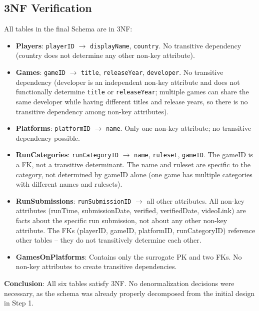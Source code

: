 \documentclass[11pt]{article}
\begin{document}
\subsection*{3NF Verification}

All tables in the final Schema are in 3NF:
\begin{itemize}[leftmargin=2em]
    \item \textbf{Players}: \texttt{playerID} $\rightarrow$ \texttt{displayName}, \texttt{country}. No transitive dependency (country does not determine any other non-key attribute).
    \item \textbf{Games}: \texttt{gameID} $\rightarrow$ \texttt{title}, \texttt{releaseYear}, \texttt{developer}. No transitive dependency (developer is an independent non-key attribute and does not functionally determine \texttt{title} or \texttt{releaseYear}; multiple games can share the same developer while having different titles and release years, so there is no transitive dependency among non-key attributes).
    \item \textbf{Platforms}: \texttt{platformID} $\rightarrow$ \texttt{name}. Only one non-key attribute; no transitive dependency possible.
    \item \textbf{RunCategories}: \texttt{runCategoryID} $\rightarrow$ \texttt{name}, \texttt{ruleset}, \texttt{gameID}. The gameID is a FK, not a transitive determinant. The name and ruleset are specific to the category, not determined by gameID alone (one game has multiple categories with different names and rulesets).
    \item \textbf{RunSubmissions}: \texttt{runSubmissionID} $\rightarrow$ all other attributes. All non-key attributes (runTime, submissionDate, verified, verifiedDate, videoLink) are facts about the specific run submission, not about any other non-key attribute. The FKs (playerID, gameID, platformID, runCategoryID) reference other tables -- they do not transitively determine each other.
    \item \textbf{GamesOnPlatforms}: Contains only the surrogate PK and two FKs. No non-key attributes to create transitive dependencies.
\end{itemize}

\textbf{Conclusion}: All six tables satisfy 3NF. No denormalization decisions were necessary, as the schema was already properly decomposed from the initial design in Step 1.

\hrulefill

\end{document}
